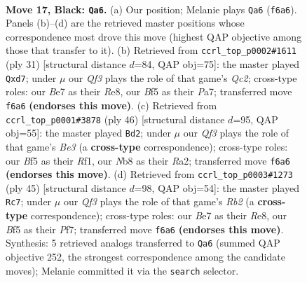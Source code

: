 \documentclass[11pt]{article}
\begin{document}
\clearpage

\begin{figure}[p]\centering
\begin{subfigure}{0.46\textwidth}\centering
\resizebox{\linewidth}{!}{%
\newchessgame
\chessboard[
  setfen={rnr3k1/ppp1bp1p/5qp1/P2pNb1P/3P1P2/1P2P1P1/8/RNBQ1RK1 b - - 0 17},
  showmover=false,
  pgfstyle=straightmove, color=movearrow, markmove={f6-a6}
]}
\caption{}
\end{subfigure}\hfill
\begin{subfigure}{0.46\textwidth}\centering
\resizebox{\linewidth}{!}{%
\newchessgame
\chessboard[
  setfen={r3r1k1/ppqN1pp1/4b2p/n1pp4/P2P4/2P1PP2/6PP/RBBQR1K1 b - - 0 16},
  showmover=false,
  pgfstyle=straightmove, color=movearrow, markmove={c7-d7}
]}
\caption{}
\end{subfigure}
\\[4pt]
\begin{subfigure}{0.46\textwidth}\centering
\resizebox{\linewidth}{!}{%
\newchessgame
\chessboard[
  setfen={2r1r1k1/1pq1bpp1/p6p/P1pPp3/2Pn2P1/1P1QB2P/R4PB1/5RK1 w - - 3 24},
  showmover=false,
  pgfstyle=straightmove, color=movearrow, markmove={e3-d2}
]}
\caption{}
\end{subfigure}\hfill
\begin{subfigure}{0.46\textwidth}\centering
\resizebox{\linewidth}{!}{%
\newchessgame
\chessboard[
  setfen={3qr1k1/1r3p1p/pN1p1bp1/Pb1P1p2/1Pp5/2N1P1PP/3Q1P2/2R1R1K1 b - - 0 23},
  showmover=false,
  pgfstyle=straightmove, color=movearrow, markmove={b7-c7}
]}
\caption{}
\end{subfigure}
\caption{\textbf{Move 17, Black: \texttt{Qa6}.} (a) Our position; Melanie plays \texttt{Qa6} (\texttt{f6a6}). Panels (b)--(d) are the retrieved master positions whose correspondence most drove this move (highest QAP objective among those that transfer to it). (b) Retrieved from \texttt{ccrl\_top\_p0002\#1611} (ply 31) [structural distance $d$=84, QAP obj=75]: the master played \texttt{Qxd7}; under $\mu$ our \emph{Qf3} plays the role of that game's \emph{Qc2}; cross-type roles: our \emph{B}e7 as their \emph{R}e8, our \emph{B}f5 as their \emph{P}a7; transferred move \texttt{f6a6} \textbf{(endorses this move)}. (c) Retrieved from \texttt{ccrl\_top\_p0001\#3878} (ply 46) [structural distance $d$=95, QAP obj=55]: the master played \texttt{Bd2}; under $\mu$ our \emph{Qf3} plays the role of that game's \emph{Be3} (a \textbf{cross-type} correspondence); cross-type roles: our \emph{B}f5 as their \emph{R}f1, our \emph{N}b8 as their \emph{R}a2; transferred move \texttt{f6a6} \textbf{(endorses this move)}. (d) Retrieved from \texttt{ccrl\_top\_p0003\#1273} (ply 45) [structural distance $d$=98, QAP obj=54]: the master played \texttt{Rc7}; under $\mu$ our \emph{Qf3} plays the role of that game's \emph{Rb2} (a \textbf{cross-type} correspondence); cross-type roles: our \emph{B}e7 as their \emph{R}e8, our \emph{B}f5 as their \emph{P}f7; transferred move \texttt{f6a6} \textbf{(endorses this move)}. Synthesis: 5 retrieved analogs transferred to \texttt{Qa6} (summed QAP objective 252, the strongest correspondence among the candidate moves); Melanie committed it via the \texttt{search} selector.}
\label{fig:thought-m33}
\end{figure}
\end{document}

